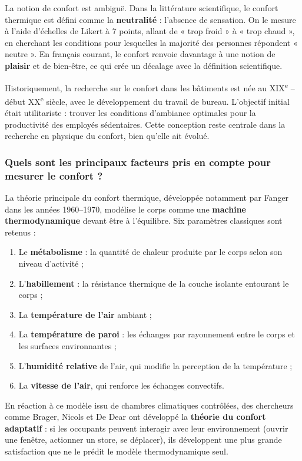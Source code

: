 La notion de confort est ambiguë. Dans la littérature scientifique, le confort thermique est défini comme la \textbf{neutralité} : l'absence de sensation. On le mesure à l'aide d'échelles de Likert à 7 points, allant de « trop froid » à « trop chaud », en cherchant les conditions pour lesquelles la majorité des personnes répondent « neutre ». En français courant, le confort renvoie davantage à une notion de \textbf{plaisir} et de bien-être, ce qui crée un décalage avec la définition scientifique.

Historiquement, la recherche sur le confort dans les bâtiments est née au XIX\textsuperscript{e} -- début XX\textsuperscript{e} siècle, avec le développement du travail de bureau. L'objectif initial était utilitariste : trouver les conditions d'ambiance optimales pour la productivité des employés sédentaires. Cette conception reste centrale dans la recherche en physique du confort, bien qu'elle ait évolué.

\subsubsection{Quels sont les principaux facteurs pris en compte pour mesurer le confort ?}

La théorie principale du confort thermique, développée notamment par Fanger dans les années 1960--1970, modélise le corps comme une \textbf{machine thermodynamique} devant être à l'équilibre. Six paramètres classiques sont retenus :

\begin{enumerate}
    \item Le \textbf{métabolisme} : la quantité de chaleur produite par le corps selon son niveau d'activité ;
    \item L'\textbf{habillement} : la résistance thermique de la couche isolante entourant le corps ;
    \item La \textbf{température de l'air} ambiant ;
    \item La \textbf{température de paroi} : les échanges par rayonnement entre le corps et les surfaces environnantes ;
    \item L'\textbf{humidité relative} de l'air, qui modifie la perception de la température ;
    \item La \textbf{vitesse de l'air}, qui renforce les échanges convectifs.
\end{enumerate}

En réaction à ce modèle issu de chambres climatiques contrôlées, des chercheurs comme Brager, Nicols et De Dear ont développé la \textbf{théorie du confort adaptatif} : si les occupants peuvent interagir avec leur environnement (ouvrir une fenêtre, actionner un store, se déplacer), ils développent une plus grande satisfaction que ne le prédit le modèle thermodynamique seul.

